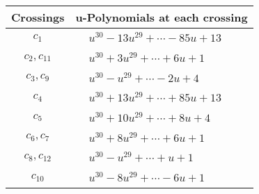 \documentclass[1p]{elsarticle_modified}
\theoremstyle{definition}
\begin{document}
\begin{tabular}{m{50pt}|m{274pt}}
Crossings & \hspace{64pt}u-Polynomials at each crossing \\
\hline $$\begin{aligned}c_{1}\end{aligned}$$&$\begin{aligned}
&u^{30}-13 u^{29}+\cdots-85 u+13
\end{aligned}$\\
\hline $$\begin{aligned}c_{2},c_{11}\end{aligned}$$&$\begin{aligned}
&u^{30}+3 u^{29}+\cdots+6 u+1
\end{aligned}$\\
\hline $$\begin{aligned}c_{3},c_{9}\end{aligned}$$&$\begin{aligned}
&u^{30}- u^{29}+\cdots-2 u+4
\end{aligned}$\\
\hline $$\begin{aligned}c_{4}\end{aligned}$$&$\begin{aligned}
&u^{30}+13 u^{29}+\cdots+85 u+13
\end{aligned}$\\
\hline $$\begin{aligned}c_{5}\end{aligned}$$&$\begin{aligned}
&u^{30}+10 u^{29}+\cdots+8 u+4
\end{aligned}$\\
\hline $$\begin{aligned}c_{6},c_{7}\end{aligned}$$&$\begin{aligned}
&u^{30}+8 u^{29}+\cdots+6 u+1
\end{aligned}$\\
\hline $$\begin{aligned}c_{8},c_{12}\end{aligned}$$&$\begin{aligned}
&u^{30}- u^{29}+\cdots+u+1
\end{aligned}$\\
\hline $$\begin{aligned}c_{10}\end{aligned}$$&$\begin{aligned}
&u^{30}-8 u^{29}+\cdots-6 u+1
\end{aligned}$\\
\hline
\end{tabular}\\~\\
\end{document}
